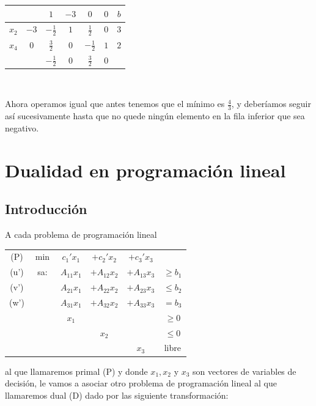 \documentclass[PM.tex]{subfiles}
\begin{document}
\begin{tabular}{|c|c| c c| c c|c|}
\hline
 &            & $1$ & $-3$ & $0$ & $0$ & $b$  \\
 \hline
 $x_2$ & $-3$ & $-\frac{1}{2}$ & $1$ &   $\frac{1}{2}$ &   $0$ & $3$\\
  $x_4$ & $0$ & $\frac{3}{2}$ & $0$ &    $-\frac{1}{2}$ &  $1$ & $2$\\
 \hline
 &            & $\boxed{-\frac{1}{2}}$ & $0$ & $\frac{3}{2}$ & $0$ & \\
 \hline

\end{tabular}\

Ahora operamos igual que antes tenemos que el mínimo es $\frac{4}{3}$, y deberíamos seguir así sucesivamente hasta que no quede ningún elemento en la fila inferior que sea negativo.



\chapter{Dualidad en programación lineal}
\section{Introducción}
A cada problema de programación lineal

\begin{center}
\begin{tabular}{cccccc}
(P) & $\min$ & $c_1'x_1$ & $+c_2'x_2$   & $+c_3'x_3$\\
(u') & sa: & $A_{11}x_1$ & $+A_{12}x_2$ & $+ A_{13}x_3$ & $≥ b_1$\\
(v') &     & $A_{21}x_1$ & $+A_{22}x_2$ & $+ A_{23}x_3$ & $≤ b_2$\\
(w') &     & $A_{31}x_1$ & $+A_{32}x_2$ & $+ A_{33}x_3$ & $= b_3$\\
     &     &       $x_1$ &              &               & $≥ 0$\\
     &     &             &      $x_2$   &               & $≤ 0$\\
     &     &             &              &         $x_3$ & libre
\end{tabular}
\end{center}
al que llamaremos primal (P) y donde $x_1, x_2$ y $x_3$ son vectores de variables de decisión, le vamos a asociar otro problema de programación lineal al que llamaremos dual (D) dado por las siguiente transformación:
\end{document}
